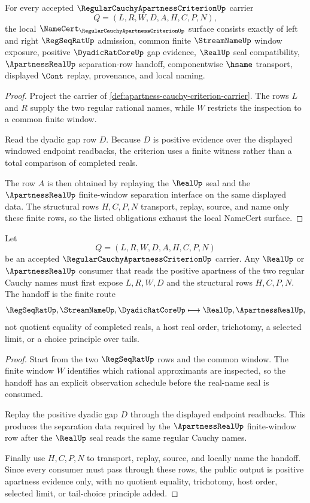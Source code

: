 \begin{theorem}
\label{thm:apartness-cauchy-criterion-namecert-obligations}
For every accepted $\RegularCauchyApartnessCriterionUp$ carrier
$$
Q=(L,R,W,D,A,H,C,P,N),
$$
the local $\NameCert_{\RegularCauchyApartnessCriterionUp}$ surface consists exactly of left and right $\RegSeqRatUp$ admission, common finite $\StreamNameUp$ window exposure, positive $\DyadicRatCoreUp$ gap evidence, $\RealUp$ seal compatibility, $\ApartnessRealUp$ separation-row handoff, componentwise $\hsame$ transport, displayed $\Cont$ replay, provenance, and local naming.
\end{theorem}
\begin{proof}
Project the carrier of \autoref{def:apartness-cauchy-criterion-carrier}. The rows $L$ and $R$ supply the two regular rational names, while $W$ restricts the inspection to a common finite window.

Read the dyadic gap row $D$. Because $D$ is positive evidence over the displayed windowed endpoint readbacks, the criterion uses a finite witness rather than a total comparison of completed reals.

The row $A$ is then obtained by replaying the $\RealUp$ seal and the $\ApartnessRealUp$ finite-window separation interface on the same displayed data. The structural rows $H,C,P,N$ transport, replay, source, and name only these finite rows, so the listed obligations exhaust the local NameCert surface.
\end{proof}

\begin{theorem}
\label{thm:apartness-cauchy-criterion-real-seal-handoff}
Let
$$
Q=(L,R,W,D,A,H,C,P,N)
$$
be an accepted $\RegularCauchyApartnessCriterionUp$ carrier. Any $\RealUp$ or $\ApartnessRealUp$ consumer that reads the positive apartness of the two regular Cauchy names must first expose $L,R,W,D$ and the structural rows $H,C,P,N$. The handoff is the finite route
$$
\RegSeqRatUp,\StreamNameUp,\DyadicRatCoreUp
\longmapsto
\RealUp,\ApartnessRealUp ,
$$
not quotient equality of completed reals, a host real order, trichotomy, a selected limit, or a choice principle over tails.
\end{theorem}
\begin{proof}
Start from the two $\RegSeqRatUp$ rows and the common window. The finite window $W$ identifies which rational approximants are inspected, so the handoff has an explicit observation schedule before the real-name seal is consumed.

Replay the positive dyadic gap $D$ through the displayed endpoint readbacks. This produces the separation data required by the $\ApartnessRealUp$ finite-window row after the $\RealUp$ seal reads the same regular Cauchy names.

Finally use $H,C,P,N$ to transport, replay, source, and locally name the handoff. Since every consumer must pass through these rows, the public output is positive apartness evidence only, with no quotient equality, trichotomy, host order, selected limit, or tail-choice principle added.
\end{proof}

